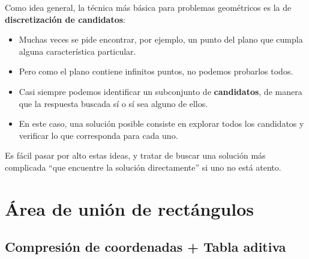 \documentclass[compress]{beamer}
\begin{document}
\begin{frame}

Como idea general, la técnica más básica para problemas geométricos es la de \textbf{discretización de candidatos}:

\begin{itemize}
    \item Muchas veces se pide encontrar, por ejemplo, un punto del plano que cumpla alguna característica particular.
    \item Pero como el plano contiene infinitos puntos, no podemos probarlos todos.
    \item Casi siempre podemos identificar un subconjunto de \textbf{candidatos}, de manera que la respuesta buscada sí o sí sea alguno de ellos.
    \item En este caso, una solución posible consiste en explorar todos los candidatos y verificar lo que corresponda para cada uno.
\end{itemize}

Es fácil pasar por alto estas ideas, y tratar de buscar una solución más complicada ``que encuentre la solución directamente'' si uno no está atento.

\end{frame}







\section{Área de unión de rectángulos}

\subsection{Compresión de coordenadas + Tabla aditiva}
\end{document}
